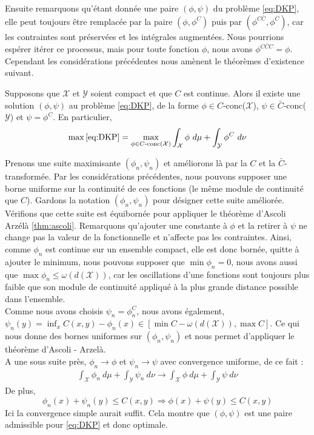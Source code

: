 \documentclass[a4paper,12pt]{article}
\begin{document}
Ensuite remarquons qu'étant donnée une paire $(\phi,\psi)$ du problème \eqref{eq:DKP}, elle peut toujours être remplacée par la paire $(\phi,\phi^C)$ puis par $(\phi^{C\bar{C}},\phi^C)$, car les contraintes sont préservées et les intégrales augmentées. 
Nous pourrions espérer itérer ce processus, mais pour toute fonction $\phi$, nous avons $\phi^{C\bar{C}C} = \phi$. Cependant les considérations précédentes nous amènent le théorèmes d'existence suivant. 
\begin{theoreme}{}
\label{thm:existDKP}
Supposons que $\mathcal{X}$ et $\mathcal{Y}$ soient compact et que $C$ est continue. Alors il existe une solution $(\phi,\psi)$ au problème \eqref{eq:DKP}, de la forme $\phi\in C$-conc($\mathcal{X}$), $\psi\in \bar{C}$-conc($\mathcal{Y}$) et $\psi=\phi^C$. En particulier, 
\begin{align}
\max\eqref{eq:DKP} = \max_{\phi\in C\text{-conc}(\mathcal{X})}\int_{\mathcal{X}}\phi\ d\mu +\int_{\mathcal{Y}} \phi^C\ d\nu
\label{eq:existenceDKP}
\end{align}
\end{theoreme}
\begin{preuve}
Prenons une suite maximisante $(\phi_n,\psi_n)$ et améliorons là par la $C$ et la $\bar{C}$-transformée. Par les considérations précédentes, nous pouvons supposer une borne uniforme sur la continuité de ces fonctions (le même module de continuité que $C$). Gardons la notation $(\phi_n,\psi_n)$  pour désigner cette suite améliorée. \\
Vérifions que cette suite est équibornée pour appliquer le théorème d'Ascoli Arzélà \eqref{thm:ascoli}. Remarquons qu'ajouter une constante à $\phi$ et la retirer à $\psi$ ne change pas la valeur de la fonctionnelle et n'affecte pas les contraintes. Ainsi, comme $\phi_n$ est continue sur un ensemble compact, elle est donc bornée, quitte à ajouter le minimum, nous pouvons supposer que $\min \phi_n=0$, nous avons aussi que $\max \phi_n \leq \omega (d(\mathcal{X}))$, car les oscillations d'une fonctions sont toujours plus faible que son module de continuité appliqué à la plus grande distance possible dans l'ensemble.\\
Comme nous avons choisis $\psi_n=\phi_n^C$, nous avons également, $\psi_n(y)=\inf_xC(x,y)-\phi_n(x)\in[\min C- \omega (d(\mathcal{X})),\max C]$. Ce qui nous donne des bornes uniformes sur $(\phi_n,\psi_n)$ et nous permet d'appliquer le théorème d'Ascoli - Arzelà.\\
A une sous suite près, $\phi_n\rightarrow\phi$ et $\psi_n\rightarrow\psi$ avec convergence uniforme, de ce fait : 
\begin{align}
\int_{\mathcal{X}}\phi_n\ d\mu + \int_{\mathcal{Y}}\psi_n\ d\nu \rightarrow \int_{\mathcal{X}}\phi\ d\mu + \int_{\mathcal{Y}}\psi\ d\nu
\end{align}
De plus, 
$$
\phi_n(x)+\psi_n(y)\leq C(x,y) \Rightarrow \phi(x)+\psi(y)\leq C(x,y)
$$
Ici la convergence simple aurait suffit. Cela montre que $(\phi,\psi)$ est une paire admissible pour \eqref{eq:DKP} et donc optimale.
\end{preuve}
\end{document}
